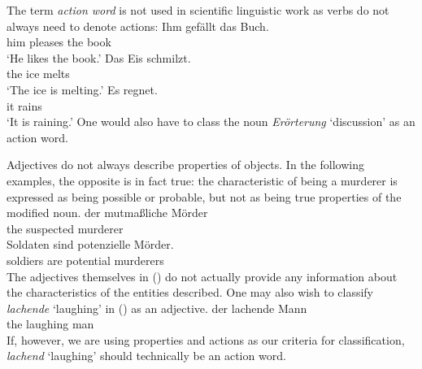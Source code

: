 {The term \emph{action word} is not used in scientific linguistic work as verbs do not always need
to denote actions:
\eal
\ex
\gll Ihm gefällt das Buch.\\
	 him pleases the book\\
\glt `He likes the book.'
\ex 
\gll Das Eis schmilzt.\\
	 the ice melts\\
\glt `The ice is melting.'
\ex 
\gll Es regnet.\\
	 it rains\\
\glt `It is raining.'
\zl
One would also have to class the noun \emph{Erörterung} `discussion' as an action word.

Adjectives do not always describe properties of objects. In the following examples, the opposite is in fact true:
the characteristic of being a murderer is expressed as being possible or probable,  but not as being true properties of the modified noun.
\eal
\ex 
\gll der mutmaßliche Mörder\\
     the suspected murderer\\
\ex 
\gll Soldaten sind potenzielle Mörder.\\
     soldiers are potential murderers\\
\zl
The adjectives themselves in () do not actually provide any information about the characteristics of the entities described. One
may also wish to classify \emph{lachende} `laughing' in () as an adjective.
\ea
\gll der lachende Mann\\
	 the laughing man\\
\z
If, however, we are using properties and actions as our criteria for classification, \emph{lachend}
`laughing' should technically be an action word.

}
